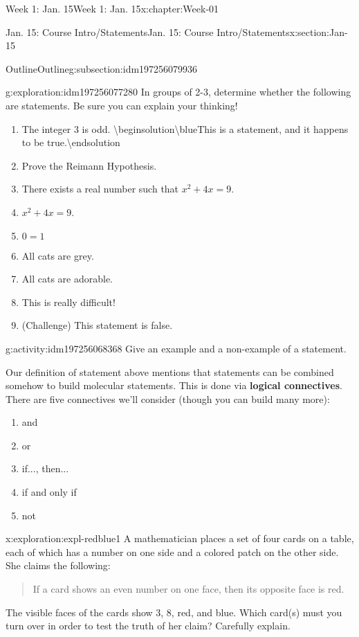 \documentclass[oneside,10pt,]{book}
\newcommand{\terminology}[1]{\textbf{#1}}
\numberwithin{equation}{section}
\begin{document}
\begin{chapterptx}{Week 1: Jan. 15}{}{Week 1: Jan. 15}{}{}{x:chapter:Week-01}
\begin{sectionptx}{Jan. 15: Course Intro\slash{}Statements}{}{Jan. 15: Course Intro\slash{}Statements}{}{}{x:section:Jan-15}
\begin{subsectionptx}{Outline}{}{Outline}{}{}{g:subsection:idm197256079936}
\begin{exploration}{}{g:exploration:idm197256077280}
In groups of 2-3, determine whether the following are statements. Be sure you can explain your thinking!%
\begin{enumerate}
\item{}The integer 3 is odd.%
 \textbackslash{}begin\textbraceleft{}solution\textbraceright{}\textbackslash{}blue\textbraceleft{}This is a statement, and it happens to be true.\textbraceright{}\textbackslash{}end\textbraceleft{}solution\textbraceright{} \item{}Prove the Reimann Hypothesis.%
\item{}There exists a real number such that \(x^2 + 4x= 9\).%
\item{}\(x^2+4x=9\).%
\item{}\(\displaystyle 0=1\)%
\item{}All cats are grey.%
\item{}All cats are adorable.%
\item{}This is really difficult!%
\item{}(Challenge) This statement is false.%
\end{enumerate}
%
\end{exploration}%
\begin{activity}{}{g:activity:idm197256068368}%
Give an example and a non-example of a statement.%
\end{activity}%
Our definition of statement above mentions that statements can be combined somehow to build molecular statements. This is done via \terminology{logical connectives}. There are five connectives we'll consider (though you can build many more):%
%
\begin{enumerate}
\item{}and%
\item{}or%
\item{}if..., then...%
\item{}if and only if%
\item{}not%
\end{enumerate}
\begin{exploration}{}{x:exploration:expl-redblue1}%
A mathematician places a set of four cards on a table, each of which has a number on one side and a colored patch on the other side. She claims the following: \begin{quote}%
If a card shows an even number on one face, then its opposite face is red.\end{quote}
 The visible faces of the cards show 3, 8, red, and blue. Which card(s) must you turn over in order to test the truth of her claim? Carefully explain.%

\end{exploration}
\end{subsectionptx}
\end{sectionptx}
\end{chapterptx}
\end{document}
